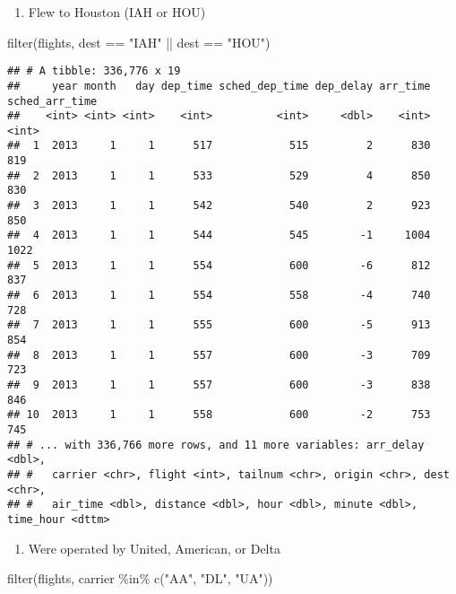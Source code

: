 \documentclass[
]{article}
\newenvironment{Shaded}{\begin{snugshade}}{\end{snugshade}}
\newcommand{\FunctionTok}[1]{\textcolor[rgb]{0.00,0.00,0.00}{#1}}
\newcommand{\NormalTok}[1]{#1}
\newcommand{\SpecialCharTok}[1]{\textcolor[rgb]{0.00,0.00,0.00}{#1}}
\newcommand{\StringTok}[1]{\textcolor[rgb]{0.31,0.60,0.02}{#1}}
\providecommand{\tightlist}{%
  \setlength{\itemsep}{0pt}\setlength{\parskip}{0pt}}
\begin{document}
\begin{enumerate}
\def\labelenumi{\arabic{enumi}.}
\setcounter{enumi}{1}
\tightlist
\item
  Flew to Houston (IAH or HOU)
\end{enumerate}

\begin{Shaded}
\begin{Highlighting}[]
\FunctionTok{filter}\NormalTok{(flights, dest }\SpecialCharTok{==} \StringTok{"IAH"} \SpecialCharTok{||}\NormalTok{ dest }\SpecialCharTok{==} \StringTok{"HOU"}\NormalTok{)}
\end{Highlighting}
\end{Shaded}

\begin{verbatim}
## # A tibble: 336,776 x 19
##     year month   day dep_time sched_dep_time dep_delay arr_time sched_arr_time
##    <int> <int> <int>    <int>          <int>     <dbl>    <int>          <int>
##  1  2013     1     1      517            515         2      830            819
##  2  2013     1     1      533            529         4      850            830
##  3  2013     1     1      542            540         2      923            850
##  4  2013     1     1      544            545        -1     1004           1022
##  5  2013     1     1      554            600        -6      812            837
##  6  2013     1     1      554            558        -4      740            728
##  7  2013     1     1      555            600        -5      913            854
##  8  2013     1     1      557            600        -3      709            723
##  9  2013     1     1      557            600        -3      838            846
## 10  2013     1     1      558            600        -2      753            745
## # ... with 336,766 more rows, and 11 more variables: arr_delay <dbl>,
## #   carrier <chr>, flight <int>, tailnum <chr>, origin <chr>, dest <chr>,
## #   air_time <dbl>, distance <dbl>, hour <dbl>, minute <dbl>, time_hour <dttm>
\end{verbatim}

\begin{enumerate}
\def\labelenumi{\arabic{enumi}.}
\setcounter{enumi}{2}
\tightlist
\item
  Were operated by United, American, or Delta
\end{enumerate}

\begin{Shaded}
\begin{Highlighting}[]
\FunctionTok{filter}\NormalTok{(flights, carrier }\SpecialCharTok{\%in\%} \FunctionTok{c}\NormalTok{(}\StringTok{"AA"}\NormalTok{, }\StringTok{"DL"}\NormalTok{, }\StringTok{"UA"}\NormalTok{))}
\end{Highlighting}
\end{Shaded}
\end{document}
